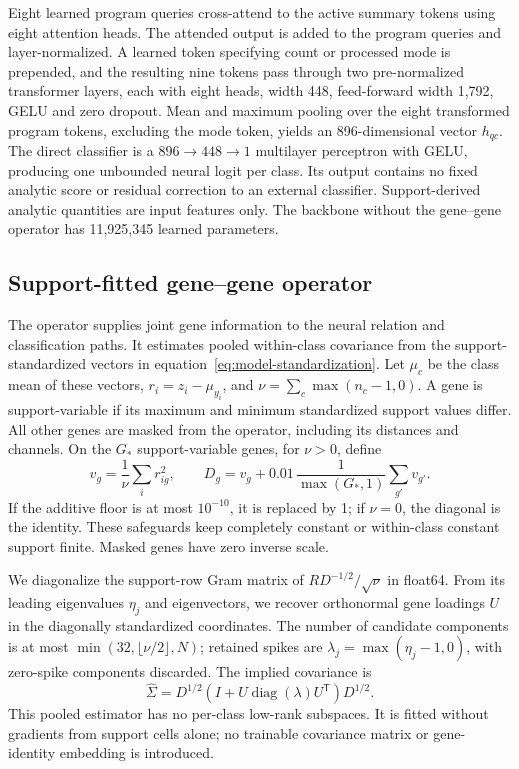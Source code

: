 Eight learned program queries cross-attend to the active summary tokens using eight attention heads. The attended output is added to the program queries and layer-normalized. A learned token specifying count or processed mode is prepended, and the resulting nine tokens pass through two pre-normalized transformer layers\citep{vaswani2017attention}, each with eight heads, width 448, feed-forward width 1,792, GELU and zero dropout. Mean and maximum pooling over the eight transformed program tokens, excluding the mode token, yields an 896-dimensional vector $h_{qc}$. The direct classifier is a $896\rightarrow448\rightarrow1$ multilayer perceptron with GELU, producing one unbounded neural logit per class. Its output contains no fixed analytic score or residual correction to an external classifier. Support-derived analytic quantities are input features only. The backbone without the gene--gene operator has 11,925,345 learned parameters.

\subsection*{Support-fitted gene--gene operator}
\label{methods:gene-operator}
The operator supplies joint gene information to the neural relation and classification paths. It estimates pooled within-class covariance from the support-standardized vectors in equation~\ref{eq:model-standardization}. Let $\mu_c$ be the class mean of these vectors, $r_i=z_i-\mu_{y_i}$, and $\nu=\sum_c\max(n_c-1,0)$. A gene is support-variable if its maximum and minimum standardized support values differ. All other genes are masked from the operator, including its distances and channels. On the $G_\ast$ support-variable genes, for $\nu>0$, define
\begin{equation}
 v_g=\frac1\nu\sum_i r_{ig}^2,\qquad
 D_g=v_g+0.01\,\frac1{\max(G_\ast,1)}\sum_{g'}v_{g'}.
 \label{eq:operator-diagonal}
\end{equation}
If the additive floor is at most $10^{-10}$, it is replaced by 1; if $\nu=0$, the diagonal is the identity. These safeguards keep completely constant or within-class constant support finite. Masked genes have zero inverse scale.

We diagonalize the support-row Gram matrix of $R D^{-1/2}/\sqrt\nu$ in float64. From its leading eigenvalues $\eta_j$ and eigenvectors, we recover orthonormal gene loadings $U$ in the diagonally standardized coordinates. The number of candidate components is at most $\min(32,\lfloor\nu/2\rfloor,N)$; retained spikes are $\lambda_j=\max(\eta_j-1,0)$, with zero-spike components discarded. The implied covariance is
\begin{equation}
 \widehat\Sigma=D^{1/2}\left(I+U\operatorname{diag}(\lambda)U^\mathsf{T}\right)D^{1/2}.
 \label{eq:operator-covariance}
\end{equation}
This pooled estimator has no per-class low-rank subspaces. It is fitted without gradients from support cells alone; no trainable covariance matrix or gene-identity embedding is introduced.

